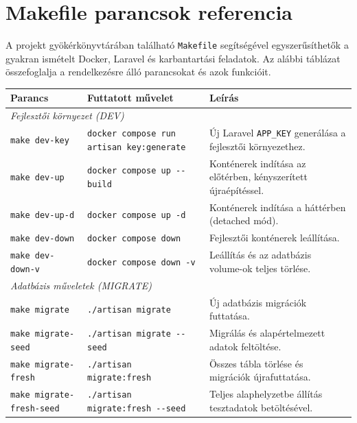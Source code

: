 \chapter{Makefile parancsok referencia}
\label{ch:makefile}

A projekt gyökérkönyvtárában található \texttt{Makefile} segítségével egyszerűsíthetők a gyakran ismételt Docker, Laravel és karbantartási feladatok. Az alábbi táblázat összefoglalja a rendelkezésre álló parancsokat és azok funkcióit.

\begin{table}[h!]
    \centering
    \small
    \begin{tabularx}{\textwidth}{|l|X|X|}
        \hline
        \rowcolor[HTML]{EFEFEF} 
        \textbf{Parancs} & \textbf{Futtatott művelet} & \textbf{Leírás} \\ \hline
        
        \multicolumn{3}{|l|}{\cellcolor[HTML]{F5F5F5}\textit{Fejlesztői környezet (DEV)}} \\ \hline
        \texttt{make dev-key} & \texttt{docker compose run artisan key:generate} & Új Laravel \texttt{APP\_KEY} generálása a fejlesztői környezethez. \\ \hline
        \texttt{make dev-up} & \texttt{docker compose up -{}-build} & Konténerek indítása az előtérben, kényszerített újraépítéssel. \\ \hline
        \texttt{make dev-up-d} & \texttt{docker compose up -d} & Konténerek indítása a háttérben (detached mód). \\ \hline
        \texttt{make dev-down} & \texttt{docker compose down} & Fejlesztői konténerek leállítása. \\ \hline
        \texttt{make dev-down-v} & \texttt{docker compose down -v} & Leállítás és az adatbázis volume-ok teljes törlése. \\ \hline
        
        \multicolumn{3}{|l|}{\cellcolor[HTML]{F5F5F5}\textit{Adatbázis műveletek (MIGRATE)}} \\ \hline
        \texttt{make migrate} & \texttt{./artisan migrate} & Új adatbázis migrációk futtatása. \\ \hline
        \texttt{make migrate-seed} & \texttt{./artisan migrate -{}-seed} & Migrálás és alapértelmezett adatok feltöltése. \\ \hline
        \texttt{make migrate-fresh} & \texttt{./artisan migrate:fresh} & Összes tábla törlése és migrációk újrafuttatása. \\ \hline
        \texttt{make migrate-fresh-seed} & \texttt{./artisan migrate:fresh -{}-seed} & Teljes alaphelyzetbe állítás tesztadatok betöltésével. \\ \hline
        

\end{tabularx}
\end{table}
